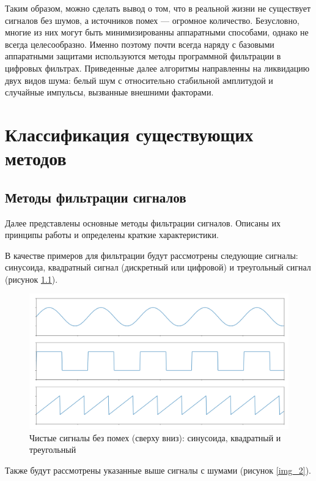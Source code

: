 Таким образом, можно сделать вывод о том, что в реальной жизни не существует сигналов без шумов, а источников помех --- огромное количество. Безусловно, многие из них могут быть минимизированны аппаратными способами, однако не всегда целесообразно. Именно поэтому почти всегда наряду с базовыми аппаратными защитами используются методы программной фильтрации в цифровых фильтрах. Приведенные далее алгоритмы направленны на ликвидацию двух видов шума: белый шум с относительно стабильной амплитудой и случайные импульсы, вызванные внешними факторами. \cite{usage}
\chapter{Классификация существующих методов}

\section{Методы фильтрации сигналов}
Далее представлены основные методы фильтрации сигналов. Описаны их принципы работы и определены краткие характеристики. \cite{theorysignal}

В качестве примеров для фильтрации будут рассмотрены следующие сигналы: синусоида, квадратный сигнал (дискретный или цифровой) и треугольный сигнал (рисунок \ref{img_1}). 

\begin{figure}[h]
	\begin{center}
		\includegraphics[pages=-, scale=0.22]{./inc/img/1.png}
		\caption{Чистые сигналы без помех (сверху вниз): синусоида, квадратный и треугольный}  
		\label{img_1}
	\end{center}
\end{figure}

Также будут рассмотрены указанные выше сигналы с шумами (рисунок \ref{img_2}).

